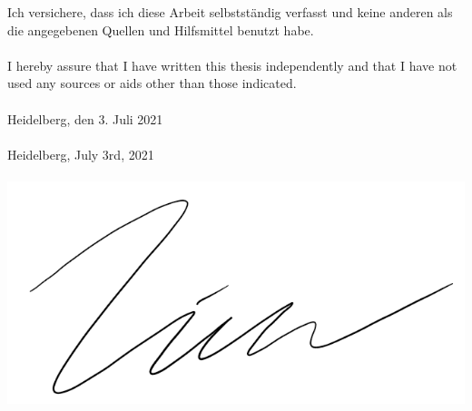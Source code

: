Ich versichere, dass ich diese Arbeit selbstst\"{a}ndig verfasst und keine anderen als die angegebenen Quellen und Hilfsmittel benutzt habe.
\\\\
\noindent I hereby assure that I have written this thesis independently and that I have not used any sources or aids other than those indicated.
\\\\
\noindent Heidelberg, den 3. Juli 2021
\\\\
\noindent Heidelberg, July 3rd, 2021
\\\\
\includegraphics[width=.5\textwidth]{Chapters/figures/unterschrift.PNG}
